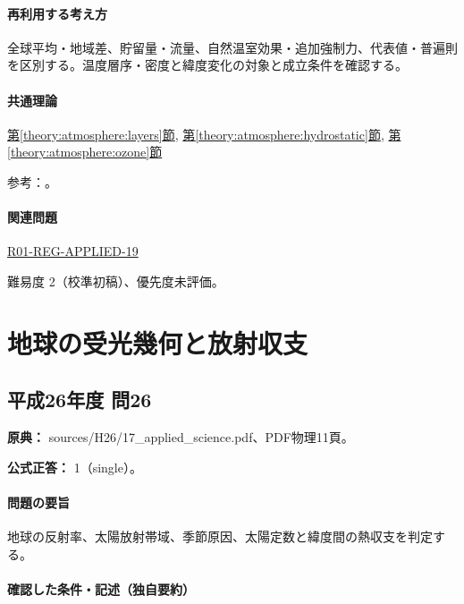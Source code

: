 \paragraph{再利用する考え方} 全球平均・地域差、貯留量・流量、自然温室効果・追加強制力、代表値・普遍則を区別する。温度層序・密度と緯度変化の対象と成立条件を確認する。

\paragraph{共通理論} \hyperref[theory:atmosphere:layers]{第\ref*{theory:atmosphere:layers}節}, \hyperref[theory:atmosphere:hydrostatic]{第\ref*{theory:atmosphere:hydrostatic}節}, \hyperref[theory:atmosphere:ozone]{第\ref*{theory:atmosphere:ozone}節}

\par 参考：\cite{atm_noaa_layers,atm_us1976,atm_jma_ozone}。

\paragraph{関連問題} \hyperref[q:r01-reg-applied-19]{R01-REG-APPLIED-19}

\par 難易度 2（校準初稿）、優先度未評価。

\section{地球の受光幾何と放射収支}

\subsection{平成26年度 問26}
\label{q:h26-reg-applied-26}

\noindent\textbf{原典：} sources/H26/17\_applied\_science.pdf、PDF物理11頁。

\textbf{公式正答：} 1（single）。

\paragraph{問題の要旨} 地球の反射率、太陽放射帯域、季節原因、太陽定数と緯度間の熱収支を判定する。

\paragraph{確認した条件・記述（独自要約）}\mbox{}\par

